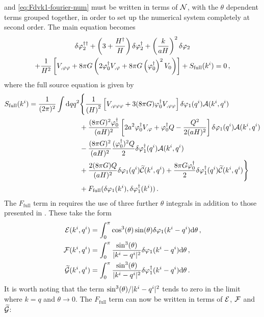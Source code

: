  and \eqref{eq:Fdvk1-fourier-num} must be written in
terms of $\mathcal{N}$, with the $\theta$ dependent terms grouped together, in order to set
up the numerical system completely at second order. 
The main equation
becomes
\begin{multline}
 \label{eq:fullso-res}
\ddN{\dvp2} + \left(3 + \frac{\dN{H}}{H}\right) \dN{\dvp2} +
\left(\frac{k}{aH}\right)^2 \dvp2 \\
% 
+ \frac{1}{H^2}\left[ \Upp + 8\pi G\left(2\dN{\vp_0}\Uphi + 8\pi G
\left(\dN{\vp_0}\right)^2 \U \right)\right] 
% 
+ S_\mathrm{full}(\kvi) = 0\,,
\end{multline}
% 
where the full source equation is given by
% 
\begin{align}
\label{eq:fullsrc-res}
S_\mathrm{full}(\kvi) = \frac{1}{(2\pi)^2}\int \d q q^2 &\Bigg\{ 
% 
\frac{1}{\left(H\right)^2} \left[ \Uppp + 3(8\pi G)\dN{\vp_0}\Upp\right]
 \dvp1(\qvi) \A(\kvi, \qvi) \nonumber \\
% 
&+\frac{(8\pi G)^2 \dN{\vp_0}}{(aH)^2}\left[ 2a^2\dN{\vp_0}\Uphi +\dN{\vp_0}Q
-\frac{Q^2}{2(aH)^2}\right] \dvp1(\qvi) \A(\kvi, \qvi) \nonumber \\
% 
&- \frac{(8\pi G)^2}{(aH)^2}\frac{(\dN{\vp_0})^2 Q}{2} \dN{\dvp1}(\qvi)
\A(\kvi, \qvi) \nonumber \\
% 
&+ \frac{2(8\pi G)Q}{(aH)^2} \dvp1(\qvi)\wt{\C}(\kvi, \qvi) 
% 
+ \frac{8\pi G \dN{\vp_0}}{2} \dN{\dvp1}(\qvi) \wt{\C}(\kvi, \qvi) \Bigg\} \nonumber
\\
% 
&+ F_\mathrm{full}(\dvp1(\kvi), \dN{\dvp1}(\kvi))\,.
\end{align}
% 
The $F_\mathrm{full}$ term in  requires the use of three further
$\theta$
integrals in addition to those presented in . These take the form
% 
\begin{align}
\label{eq:efg-terms-res}
 \E(\kvi, \qvi) &= \int_0^\pi \cos^3(\theta) \sin(\theta) \dvp1(\kvi-\qvi)\d \theta
\,,\nonumber \\
% 
\F(\kvi, \qvi) &= \int_0^\pi \frac{\sin^3(\theta)}{|\kvi-\qvi|^2} \dvp1(\kvi-\qvi)\d
\theta \,,\nonumber \\
% 
\wt{\G}(\kvi, \qvi) &= \int_0^\pi \frac{\sin^3(\theta)}{|\kvi-\qvi|^2}
\dN{\dvp1}(\kvi-\qvi)\d \theta \,.
\end{align}
% 
It is worth noting that the term $\sin^3(\theta)/|k^i-q^i|^2$ tends to zero in the
limit where $k=q$ and
$\theta\rightarrow 0$.
% 
The $F_\mathrm{full}$ term can now be written in terms of $\mathcal{E}$, $\mathcal{F}$ and $\widetilde{\mathcal{G}}$:
